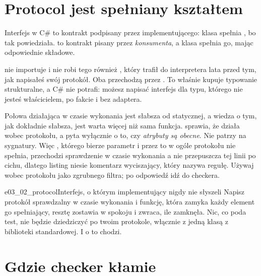 \section{Protocol jest spełniany kształtem}
\label{sec:ch03-protocol}

Interfejs w C\# to kontrakt podpisany przez implementującego: klasa spełnia
, bo tak powiedziała.  to kontrakt pisany
przez \emph{konsumenta}, a klasa spełnia go, mając odpowiednie składowe.


\noindent
{} nie importuje  i nie robi tego również
, który trafił do interpretera lata przed tym, jak napisałeś
swój protokół. Oba przechodzą przez . To właśnie kupuje
typowanie strukturalne, a C\# nie potrafi: możesz napisać interfejs dla typu,
którego nie jesteś właścicielem, po fakcie i bez adaptera.

Połowa działająca w czasie wykonania jest słabsza od statycznej, a wiedza o
tym, jak dokładnie słabsza, jest warta więcej niż sama funkcja.
 sprawia, że  działa wobec
protokołu, a  pyta wyłącznie o to, czy \emph{atrybuty są
obecne}. Nie patrzy na sygnatury. Więc , którego
 bierze parametr i przez to w ogóle protokołu nie spełnia,
przechodzi sprawdzenie w czasie wykonania \dash{} a  nie
przepuszcza tej linii po cichu, dlatego listing niesie komentarz
wyciszający, który nazywa regułę. Używaj  wobec protokołu
jako zgrubnego filtra; po odpowiedź idź do checkera.

\begin{exercise}{e03_02_protocol}{Interfejs, o którym implementujący nigdy nie słyszeli}
Napisz protokół  sprawdzalny w czasie wykonania i funkcję,
która zamyka każdy element go spełniający, resztę zostawia w spokoju i
zwraca, ile zamknęła. Nic, co poda test, nie będzie dziedziczyć po twoim
protokole, włącznie z jedną klasą z biblioteki standardowej. I o to chodzi.
\end{exercise}

\section{Gdzie checker kłamie}
\label{sec:ch03-lies}

